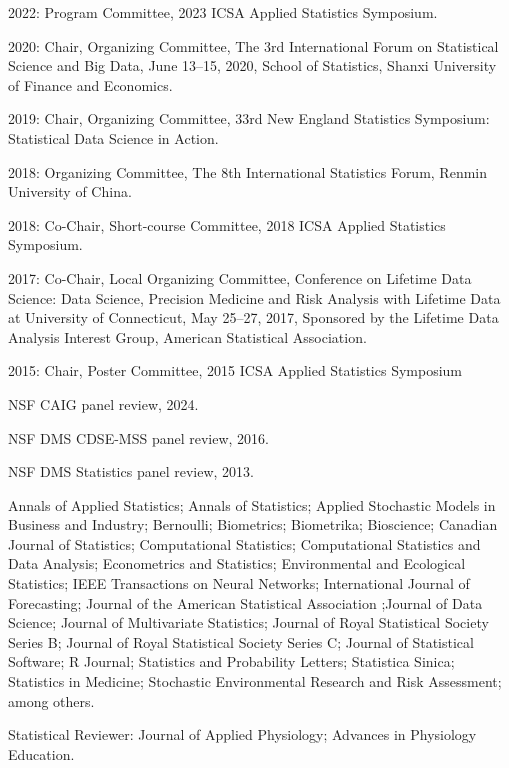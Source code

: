 \documentclass[Statistics]{vita}
\begin{document}
\begin{vita}
\begin{Services}
\begin{Conferences}
  \item 2022: Program Committee, 2023 ICSA Applied Statistics Symposium.
  \item 2020: Chair, Organizing Committee, The 3rd International Forum on Statistical Science and Big Data, June 13--15, 2020, School of Statistics, Shanxi University of Finance and Economics.
  \item 2019: Chair, Organizing Committee, 33rd New England Statistics Symposium: Statistical Data Science in Action.
  \item 2018: Organizing Committee, The 8th International Statistics Forum, Renmin University of China.
  \item 2018: Co-Chair, Short-course Committee, 2018 ICSA Applied Statistics Symposium.
  \item 2017: Co-Chair, Local Organizing Committee,  Conference on Lifetime Data Science: Data Science, Precision Medicine and Risk Analysis with Lifetime Data at University of Connecticut, May 25--27, 2017, Sponsored by the Lifetime Data Analysis Interest Group, American Statistical Association.
  \item 2015: Chair, Poster Committee, 2015 ICSA Applied Statistics Symposium
  \end{Conferences}
  \begin{GrantReviews}
  \item NSF CAIG panel review, 2024.
  \item NSF DMS CDSE-MSS panel review, 2016.
  \item NSF DMS Statistics panel review, 2013.
  \end{GrantReviews}
  \begin{JournalReviews}
  \item Annals of Applied Statistics; Annals of Statistics; Applied Stochastic Models in Business and Industry; Bernoulli; Biometrics; Biometrika; Bioscience; Canadian Journal of Statistics; Computational Statistics; Computational Statistics and Data Analysis; Econometrics and Statistics; Environmental and Ecological Statistics; IEEE Transactions on Neural Networks; International Journal of Forecasting; Journal of the American Statistical Association ;Journal of Data Science; Journal of Multivariate Statistics; Journal of Royal Statistical Society Series B; Journal of Royal Statistical Society Series C; Journal of Statistical Software; R Journal; Statistics and Probability Letters; Statistica Sinica; Statistics in Medicine; Stochastic Environmental Research and Risk Assessment; among others.
  \item Statistical Reviewer:  Journal of Applied Physiology; Advances in Physiology Education.

\end{JournalReviews}
\end{Services}
\end{vita}
\end{document}
